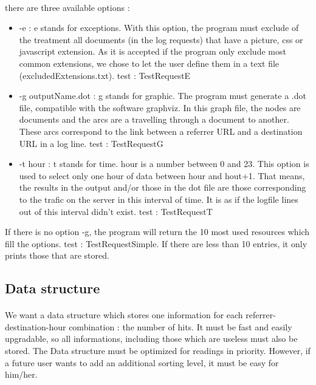 \documentclass[a4paper, 12pts]{article}
\begin{document}
\paragraph{} 
 there are three available options :
 \begin{itemize}[label=$\square$]
 \item -e : e stands for exceptions. With this option, the program must exclude of the treatment all documents (in the log requests) that have a picture, css or javascript extension. As it is accepted if the program only exclude most common extensions, we chose to let the user define them in a text file (excludedExtensions.txt). test : TestRequestE
 \item -g outputName.dot : g stands for graphic. The program must generate a .dot file, compatible with the software graphviz. In this graph file, the nodes are documents and the arcs are a travelling through a document to another. These arcs correspond to the link between a referrer URL and a destination URL in a log line. test : TestRequestG
 \item -t hour : t stands for time. hour is a number between 0 and 23. This option is used to select only one hour of data between hour and hout+1. That means, the results in the output and/or those in the dot file are those corresponding to the trafic on the server in this interval of time. It is as if the logfile lines out of this interval didn't exist. test : TestRequestT
 \end{itemize}
 If there is no option -g, the program will return the 10 most used resources which fill the options. test : TestRequestSimple. If there are less than 10 entries, it only prints those that are stored.

\subsection{Data structure}
\paragraph{}
 We want a data structure which stores one information for each referrer-destination-hour combination : the number of hits. It must be fast and easily upgradable, so all informations, including those which are useless must also be stored.
 The Data structure must be optimized for readings in priority. However, if a future user wants to add an additional sorting level, it must be easy for him/her.
 
\newpage
 
\end{document}
